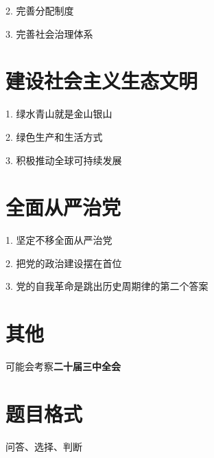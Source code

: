 2. 完善分配制度

3. 完善社会治理体系
\section*{建设社会主义生态文明}%
\label{sec*:建设社会主义生态文明}
1. 绿水青山就是金山银山

2. 绿色生产和生活方式

3. 积极推动全球可持续发展
\section*{全面从严治党}%
\label{sec*:全面从严治党}
1. 坚定不移全面从严治党

2. 把党的政治建设摆在首位

3. 党的自我革命是跳出历史周期律的第二个答案
\section*{其他}%
\label{sec*:其他}
可能会考察\textbf{二十届三中全会}
\section*{题目格式}%
\label{sec*:题目格式}
问答、选择、判断
